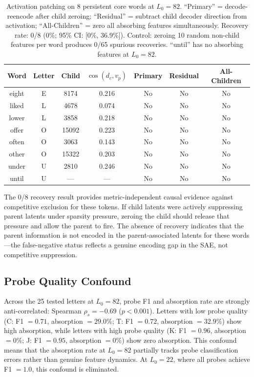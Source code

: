 \documentclass{article}
\begin{document}
\begin{table}[t]
\caption{Activation patching on 8 persistent core words at $L_0 = 82$. ``Primary'' = decode-reencode after child zeroing; ``Residual'' = subtract child decoder direction from activation; ``All-Children'' = zero all absorbing features simultaneously. Recovery rate: 0/8 (0\%; 95\% CI: [0\%, 36.9\%]). Control: zeroing 10 random non-child features per word produces 0/65 spurious recoveries. ``until'' has no absorbing features at $L_0 = 82$.}
\label{tab:patching}
\centering
\small
\begin{tabular}{ccccccc}
\toprule
Word & Letter & Child & $\cos(d_c, v_p)$ & Primary & Residual & All-Children \\
\midrule
eight & E & 8174 & 0.216 & No & No & No \\
liked & L & 4678 & 0.074 & No & No & No \\
lower & L & 3858 & 0.218 & No & No & No \\
offer & O & 15092 & 0.223 & No & No & No \\
often & O & 3063 & 0.143 & No & No & No \\
other & O & 15322 & 0.203 & No & No & No \\
under & U & 2810 & 0.246 & No & No & No \\
until & U & --- & --- & No & No & No \\
\bottomrule
\end{tabular}
\end{table}

The 0/8 recovery result provides metric-independent causal evidence against competitive exclusion for these tokens. If child latents were actively suppressing parent latents under sparsity pressure, zeroing the child should release that pressure and allow the parent to fire. The absence of recovery indicates that the parent information is not encoded in the parent-associated latents for these words---the false-negative status reflects a genuine encoding gap in the SAE, not competitive suppression.

\subsection{Probe Quality Confound}

Across the 25 tested letters at $L_0 = 82$, probe F1 and absorption rate are strongly anti-correlated: Spearman $\rho_s = -0.69$ ($p < 0.001$). Letters with low probe quality (C: F1 $= 0.71$, absorption $= 29.0\%$; T: F1 $= 0.72$, absorption $= 32.9\%$) show high absorption, while letters with high probe quality (K: F1 $= 0.96$, absorption $= 0\%$; J: F1 $= 0.95$, absorption $= 0\%$) show zero absorption. This confound means that the absorption rate at $L_0 = 82$ partially tracks probe classification errors rather than genuine feature dynamics. At $L_0 = 22$, where all probes achieve F1 $= 1.0$, this confound is eliminated.
\end{document}
